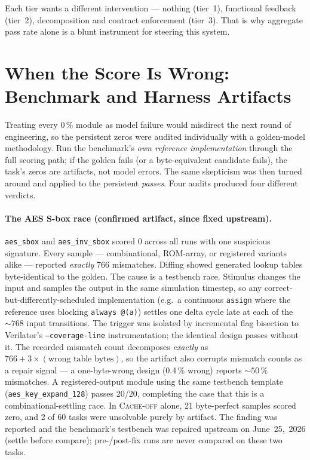 Each tier wants a different intervention --- nothing (tier~1), functional
feedback (tier~2), decomposition and contract enforcement (tier~3).
That is why aggregate pass rate alone is a blunt instrument for steering
this system.

\section{When the Score Is Wrong: Benchmark and Harness Artifacts}
\label{sec:results-artifacts}

Treating every 0\,\% module as model failure would misdirect the next
round of engineering, so the persistent zeros were audited individually
with a golden-model methodology. Run the benchmark's \emph{own reference
implementation} through the full scoring path; if the golden fails (or
a byte-equivalent candidate fails), the task's zeros are artifacts, not
model errors. The same skepticism was then turned around and applied to
the persistent \emph{passes}. Four audits produced four different
verdicts.

\paragraph{The AES S-box race (confirmed artifact, since fixed upstream).}
\texttt{aes\_sbox} and \texttt{aes\_inv\_sbox} scored 0 across all runs
with one suspicious signature. Every sample --- combinational,
ROM-array, or registered variants alike --- reported \emph{exactly} 766
mismatches. Diffing showed generated lookup tables byte-identical to the
golden. The cause is a testbench race. Stimulus changes the input and
samples the output in the same simulation timestep, so any
correct-but-differently-scheduled implementation (e.g.\ a continuous
\texttt{assign} where the reference uses blocking \texttt{always @(a)})
settles one delta cycle late at each of the ${\sim}768$ input transitions.
The trigger was isolated by incremental flag bisection to Verilator's
\texttt{--coverage-line} instrumentation; the identical design passes
without it. The recorded mismatch count decomposes \emph{exactly}
as $766 + 3\times(\text{wrong table bytes})$, so the artifact also
corrupts mismatch counts as a repair signal --- a one-byte-wrong design
(0.4\,\% wrong) reports ${\sim}50\,\%$ mismatches. A registered-output
module using the same testbench template (\texttt{aes\_key\_expand\_128})
passes 20/20, completing the case that this is a combinational-settling
race. In \textsc{Cache-off} alone, 21 byte-perfect samples scored zero,
and 2 of 60 tasks were unsolvable purely by artifact. The finding
was reported and the benchmark's testbench was repaired upstream on
June~25,~2026 (settle before compare); pre-/post-fix runs are never
compared on these two tasks.


